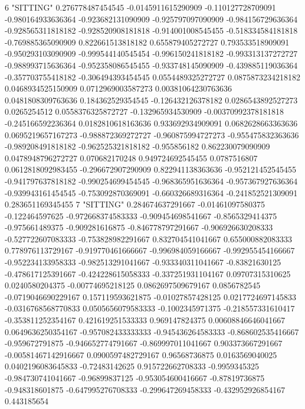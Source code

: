 6 "SITTING" 0.276778487454545 -0.0145911615290909 -0.110127728709091 -0.980164933636364 -0.923682131090909 -0.925797097090909 -0.984156729636364 -0.928565311818182 -0.928520908181818 -0.914001008545455 -0.518334584181818 -0.769885365090909 0.822661513818182 0.655879405272727 0.793533518909091 -0.950293103090909 -0.999544140545454 -0.996150241818182 -0.993313137272727 -0.988993715636364 -0.952358086545455 -0.933748145090909 -0.439885119036364 -0.357703755418182 -0.306494393454545 0.0554489325272727 0.0875873234218182 0.0468934525150909 0.0712969003587273 0.00381064230763636 0.0481808309763636 0.184362529354545 -0.126432126378182 0.0286543892527273 0.0265254512 0.0558376325872727 -0.132965934530909 -0.00370992378181818 -0.245166592236364 0.0182810618163636 0.933692934909091 0.0682628663363636 0.0695219657167273 -0.988872369272727 -0.960875994727273 -0.955475832363636 -0.989208491818182 -0.962525321818182 -0.955856182 0.862230079090909 0.0478948796272727 0.070682170248 0.949724692545455 0.0787516807 0.0612818092983455 -0.296672907290909 0.822941138363636 -0.952121452545455 -0.941797637818182 -0.990254699454545 -0.968365951636364 -0.957367927636364 -0.939943161454545 -0.753092870369091 -0.660326689316364 -0.241852521309091 0.283651169345455
7 "SITTING" 0.284674637291667 -0.01461097580375 -0.122464597625 -0.972668374583333 -0.909454698541667 -0.8565329414375 -0.975661489375 -0.909281616875 -0.846778797291667 -0.906926630208333 -0.527722607083333 -0.753828982291667 0.832704541041667 0.655000882083333 0.778976113729167 -0.919770461666667 -0.996984059166667 -0.992955454166667 -0.952234133958333 -0.982513291041667 -0.933340311041667 -0.83821630125 -0.478617125391667 -0.424228615058333 -0.337251931104167 0.09707315310625 0.0240580204375 -0.00774695218125 0.0862697509679167 0.0856782545 -0.0719046690229167 0.157119593621875 -0.01027857428125 0.0217724697145833 -0.0316768568770833 0.0505656079583333 -0.1002345971375 -0.218557331610417 -0.353811252354167 0.421619251533333 0.969147824375 0.00608846646041667 0.0649636250354167 -0.957082433333333 -0.945436264583333 -0.868602535416667 -0.959672791875 -0.946652774791667 -0.869997011041667 0.903373667291667 -0.00581467142916667 0.0900597482729167 0.96568736875 0.0163569040025 0.0402196083645833 -0.72483142625 0.915722662708333 -0.9959345325 -0.984730741041667 -0.96899837125 -0.953054600416667 -0.87819736875 -0.948318601875 -0.647995276708333 -0.299647269458333 -0.432952926854167 0.443185654
